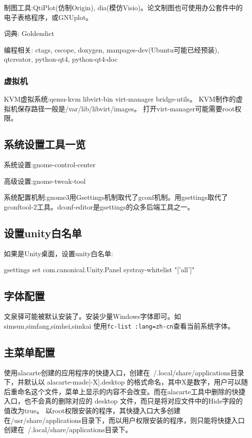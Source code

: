 制图工具:QtiPlot(仿制Origin), dia(模仿Visio)。论文制图也可使用办公套件中的电子表格程序，或GNUplot。 

词典: Goldendict

编程相关: ctags, cscope, doxygen, manpages-dev(Ubuntu可能已经预装), qtcreator, python-qt4, python-qt4-doc

\subsubsection{虚拟机}
KVM虚拟系统:qemu-kvm libvirt-bin virt-manager bridge-utils。
KVM制作的虚拟机保存路径一般是/var/lib/libvirt/images。
打开virt-manager可能需要root权限。


\subsection{系统设置工具一览}

系统设置:gnome-control-center

高级设置:gnome-tweak-tool

系统配置机制:gnome3用Gsettings机制取代了gconf机制。用gsettings取代了gconftool-2工具。dconf-editor是gsettings的众多后端工具之一。

\subsection{设置unity白名单}
如果是Unity桌面，设置unity白名单:
\begin{shellcmd}
gsettings set com.canonical.Unity.Panel systray-whitelist "['all']"
\end{shellcmd}

\subsection{字体配置}
文泉驿可能被默认安装了。安装少量Windows字体即可。如simsun,simfang,simhei,simkai
使用\verb+fc-list :lang=zh-cn+查看当前系统字体。

\subsection{主菜单配置}
使用alacarte创建的应用程序的快捷入口，创建在~/.local/share/applications目录下，并默认以 alacarte-made[-X].desktop 的格式命名，其中X是数字，用户可以随后重命名这个文件，菜单上显示的内容不会改变。而在alacarte工具中删除的快捷入口，也不会真的删除对应的 desktop 文件，而只是将对应文件中的Hide字段的值改为true。
以root权限安装的程序，其快捷入口大多创建在/usr/share/applications目录下，而以用户权限安装的程序，则只能将快捷入口创建在~/.local/share/applications目录下。


